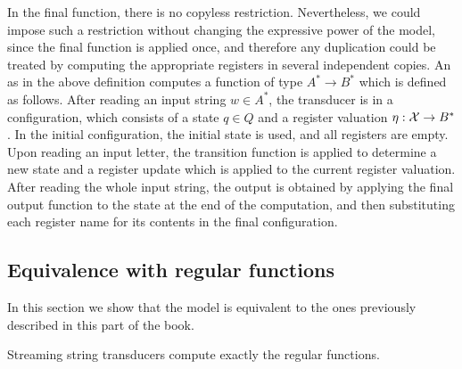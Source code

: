 In the final function, there is no copyless restriction. Nevertheless, we could impose such a restriction without changing the expressive power of the model, since the final function is applied once, and therefore any duplication could be treated by computing the appropriate registers in several independent copies.
An \sst as in the above definition computes a function of type $A^* \to B^*$ which is defined as follows. After reading an input string $w \in A^*$, the transducer is in a configuration, which consists of a state $q \in Q$ and a register valuation $\eta : \mathcal X \to B^*$. In the initial configuration, the initial state is used, and all registers are empty. Upon reading an input letter, the transition function is applied to determine a new state and a register update which is applied to the current register valuation. After reading the whole input string, the output is obtained by applying the final output function to the  state at the end of the computation, and then substituting each register name for its contents in the final configuration.



\subsection{Equivalence with regular functions}
\label{sec:sst-equivalence-two-way}
In this section we show that  the \sst model is equivalent to the ones previously described in this part of the book.
\begin{theorem}
    \label{theorem:sst-two-way-equivalence}
    Streaming string transducers compute exactly the regular functions.
\end{theorem}

